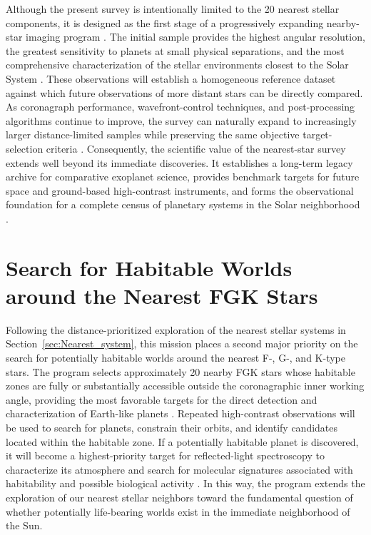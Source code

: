 Although the present survey is intentionally limited to the 20 nearest stellar components, it is designed as the first stage of a progressively expanding nearby-star imaging program \cite{LUVOIR2019}. 
The initial sample provides the highest angular resolution, the greatest sensitivity to planets at small physical separations, and the most comprehensive characterization of the stellar environments closest to the Solar System \cite{Guyon2006}. 
These observations will establish a homogeneous reference dataset against which future observations of more distant stars can be directly compared. As coronagraph performance, wavefront-control techniques, and post-processing algorithms continue to improve, the survey can naturally expand to increasingly larger distance-limited samples while preserving the same objective target-selection criteria \cite{Currie2022}. 
Consequently, the scientific value of the nearest-star survey extends well beyond its immediate discoveries. It establishes a long-term legacy archive for comparative exoplanet science, provides benchmark targets for future space and ground-based high-contrast instruments, and forms the observational foundation for a complete census of planetary systems in the Solar neighborhood \cite{LUVOIR2019}.

% 
\section{Search for Habitable Worlds around the Nearest FGK Stars}
\label{sec:Search-Habitable}

Following the distance-prioritized exploration of the nearest stellar systems in
Section~\ref{sec:Nearest_system}, this mission places a second major priority on the search for potentially
habitable worlds around the nearest F-, G-, and K-type stars. The program selects 
approximately 20 nearby FGK stars whose habitable zones are fully or substantially 
accessible outside the coronagraphic inner working angle, providing the most favorable 
targets for the direct detection and characterization of Earth-like planets
\cite{kopparapu13,Stark2014}. Repeated high-contrast observations will be used to 
search for planets, constrain their orbits, and identify candidates located within the 
habitable zone. If a potentially habitable planet is discovered, it will become a 
highest-priority target for reflected-light spectroscopy to characterize its atmosphere 
and search for molecular signatures associated with habitability and possible biological 
activity \cite{Schwieterman2018}. In this way, the program extends the exploration of 
our nearest stellar neighbors toward the fundamental question of whether potentially 
life-bearing worlds exist in the immediate neighborhood of the Sun.

